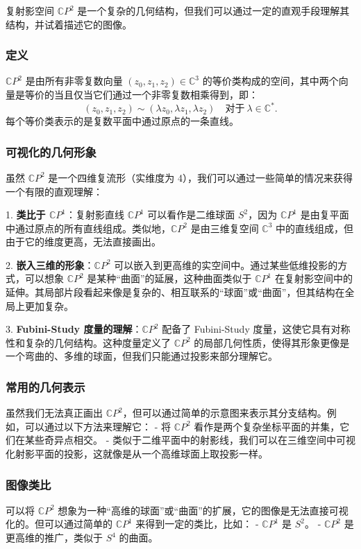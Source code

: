 \documentclass[lang=cn,zihao=5,twoside,fontset=none]{textbook}
\begin{document}
复射影空间 $\mathbb{C}P^2$ 是一个复杂的几何结构，但我们可以通过一定的直观手段理解其结构，并试着描述它的图像。

\subsubsection{定义}
$\mathbb{C}P^2$ 是由所有非零复数向量 $(z_0, z_1, z_2) \in \mathbb{C}^3$ 的等价类构成的空间，其中两个向量是等价的当且仅当它们通过一个非零复数相乘得到，即：
\[
(z_0, z_1, z_2) \sim (\lambda z_0, \lambda z_1, \lambda z_2) \quad \text{对于} \ \lambda \in \mathbb{C}^*.
\]
每个等价类表示的是复数平面中通过原点的一条直线。

\subsubsection{可视化的几何形象}
虽然 $\mathbb{C}P^2$ 是一个四维复流形（实维度为 4），我们可以通过一些简单的情况来获得一个有限的直观理解：

1. \textbf{类比于 $\mathbb{C}P^1$}：复射影直线 $\mathbb{C}P^1$ 可以看作是二维球面 $S^2$，因为 $\mathbb{C}P^1$ 是由复平面中通过原点的所有直线组成。类似地，$\mathbb{C}P^2$ 是由三维复空间 $\mathbb{C}^3$ 中的直线组成，但由于它的维度更高，无法直接画出。

2. \textbf{嵌入三维的形象}：$\mathbb{C}P^2$ 可以嵌入到更高维的实空间中。通过某些低维投影的方式，可以想象 $\mathbb{C}P^2$ 是某种“曲面”的延展，这种曲面类似于 $\mathbb{C}P^1$ 在复射影空间中的延伸。其局部片段看起来像是复杂的、相互联系的“球面”或“曲面”，但其结构在全局上更加复杂。

3. \textbf{Fubini-Study 度量的理解}：$\mathbb{C}P^2$ 配备了 Fubini-Study 度量，这使它具有对称性和复杂的几何结构。这种度量定义了 $\mathbb{C}P^2$ 的局部几何性质，使得其形象更像是一个弯曲的、多维的球面，但我们只能通过投影来部分理解它。

\subsubsection{常用的几何表示}
虽然我们无法真正画出 $\mathbb{C}P^2$，但可以通过简单的示意图来表示其分支结构。例如，可以通过以下方法来理解它：
- 将 $\mathbb{C}P^2$ 看作是两个复杂坐标平面的并集，它们在某些奇异点相交。
- 类似于二维平面中的射影线，我们可以在三维空间中可视化射影平面的投影，这就像是从一个高维球面上取投影一样。

\subsubsection{图像类比}
可以将 $\mathbb{C}P^2$ 想象为一种“高维的球面”或“曲面”的扩展，它的图像是无法直接可视化的。但可以通过简单的 $\mathbb{C}P^1$ 来得到一定的类比，比如：
- $\mathbb{C}P^1$ 是 $S^2$。
- $\mathbb{C}P^2$ 是更高维的推广，类似于 $S^4$ 的曲面。
\end{document}
